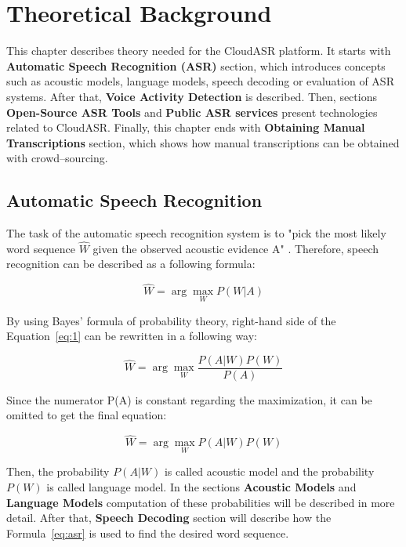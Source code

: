 \chapter{Theoretical Background}
This chapter describes theory needed for the CloudASR platform.
It starts with \textbf{Automatic Speech Recognition (ASR)} section,
  which introduces concepts such as acoustic models, language models, speech decoding or evaluation of ASR systems.
After that, \textbf{Voice Activity Detection} is described.
Then, sections \textbf{Open-Source ASR Tools} and \textbf{Public ASR services} present technologies related to CloudASR.
Finally, this chapter ends with \textbf{Obtaining Manual Transcriptions} section,
  which shows how manual transcriptions can be obtained with crowd--sourcing.

\section{Automatic Speech Recognition}
The task of the automatic speech recognition system is to "pick the most likely word sequence $\widehat{W}$
  given the observed acoustic evidence A" \cite{frederick1997statistical}.
Therefore, speech recognition can be described as a following formula:

\begin{equation}
  \label{eq:1}
  \widehat{W} = \arg \max_{W} P(W|A)
\end{equation}

By using Bayes' formula of probability theory,
  right-hand side of the Equation~\ref{eq:1} can be rewritten in a following way:

\begin{equation}
 \widehat{W} = \arg \max_{W} \frac{P(A|W) P(W)}{P(A)}
\end{equation}

Since the numerator P(A) is constant regarding the maximization,
  it can be omitted to get the final equation:

\begin{equation}
  \label{eq:asr}
  \widehat{W} = \arg \max_{W} P(A|W) P(W)
\end{equation}

Then, the probability $P(A|W)$ is called acoustic model and the probability $P(W)$ is called language model.
In the sections \textbf{Acoustic Models} and \textbf{Language Models} computation of these probabilities will be described in more detail.
After that, \textbf{Speech Decoding} section will describe how the Formula~\ref{eq:asr} is used to find the desired word sequence.


